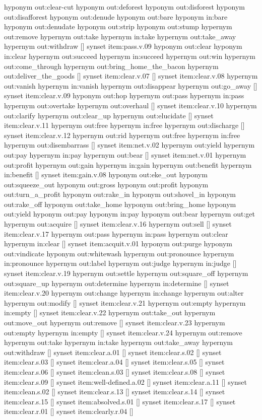 \begin{draft}
hyponym out:clear-cut
hyponym out:deforest
hyponym out:disforest
hyponym out:disafforest
hyponym out:denude
hyponym out:bare
hyponym in:bare
hyponym out:denudate
hyponym out:strip
hyponym out:stump
hypernym out:remove
hypernym out:take
hypernym in:take
hypernym out:take\_away
hypernym out:withdraw
[]
synset item:pass.v.09
hyponym out:clear
hyponym in:clear
hypernym out:succeed
hypernym in:succeed
hypernym out:win
hypernym out:come\_through
hypernym out:bring\_home\_the\_bacon
hypernym out:deliver\_the\_goods
[]
synset item:clear.v.07
[]
synset item:clear.v.08
hypernym out:vanish
hypernym in:vanish
hypernym out:disappear
hypernym out:go\_away
[]
synset item:clear.v.09
hyponym out:hop
hypernym out:pass
hypernym in:pass
hypernym out:overtake
hypernym out:overhaul
[]
synset item:clear.v.10
hypernym out:clarify
hypernym out:clear\_up
hypernym out:elucidate
[]
synset item:clear.v.11
hypernym out:free
hypernym in:free
hypernym out:discharge
[]
synset item:clear.v.12
hypernym out:rid
hypernym out:free
hypernym in:free
hypernym out:disembarrass
[]
synset item:net.v.02
hypernym out:yield
hypernym out:pay
hypernym in:pay
hypernym out:bear
[]
synset item:net.v.01
hypernym out:profit
hypernym out:gain
hypernym in:gain
hypernym out:benefit
hypernym in:benefit
[]
synset item:gain.v.08
hyponym out:eke\_out
hyponym out:squeeze\_out
hyponym out:gross
hyponym out:profit
hyponym out:turn\_a\_profit
hyponym out:rake\_in
hyponym out:shovel\_in
hyponym out:rake\_off
hyponym out:take\_home
hyponym out:bring\_home
hyponym out:yield
hyponym out:pay
hyponym in:pay
hyponym out:bear
hypernym out:get
hypernym out:acquire
[]
synset item:clear.v.16
hypernym out:sell
[]
synset item:clear.v.17
hypernym out:pass
hypernym in:pass
hypernym out:clear
hypernym in:clear
[]
synset item:acquit.v.01
hyponym out:purge
hyponym out:vindicate
hyponym out:whitewash
hypernym out:pronounce
hypernym in:pronounce
hypernym out:label
hypernym out:judge
hypernym in:judge
[]
synset item:clear.v.19
hypernym out:settle
hypernym out:square\_off
hypernym out:square\_up
hypernym out:determine
hypernym in:determine
[]
synset item:clear.v.20
hypernym out:change
hypernym in:change
hypernym out:alter
hypernym out:modify
[]
synset item:clear.v.21
hypernym out:empty
hypernym in:empty
[]
synset item:clear.v.22
hypernym out:take\_out
hypernym out:move\_out
hypernym out:remove
[]
synset item:clear.v.23
hypernym out:empty
hypernym in:empty
[]
synset item:clear.v.24
hypernym out:remove
hypernym out:take
hypernym in:take
hypernym out:take\_away
hypernym out:withdraw
[]
synset item:clear.a.01
[]
synset item:clear.s.02
[]
synset item:clear.s.03
[]
synset item:clear.a.04
[]
synset item:clear.s.05
[]
synset item:clear.s.06
[]
synset item:clean.s.03
[]
synset item:clear.s.08
[]
synset item:clear.s.09
[]
synset item:well-defined.a.02
[]
synset item:clear.a.11
[]
synset item:clean.s.02
[]
synset item:clear.s.13
[]
synset item:clear.s.14
[]
synset item:clear.s.15
[]
synset item:absolved.s.01
[]
synset item:clear.s.17
[]
synset item:clear.r.01
[]
synset item:clearly.r.04
[]
\end{draft}


